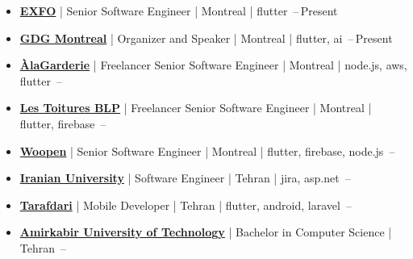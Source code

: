 \documentclass[letterpaper,11pt]{article}
\begin{document}


\begin{itemize}[leftmargin=*, noitemsep, topsep=0pt, partopsep=0pt]
      \item
            \href{https://exfo.com}
            {\textbf{EXFO}} | Senior Software Engineer | Montreal | flutter
            \hfill {}\,--\,Present

      \item    \BigGap
            \href{https://gdg.community.dev/gdg-montreal}
            {\textbf{GDG Montreal}} | Organizer and Speaker | Montreal | flutter, ai
            \hfill {}\,--\,Present

      \item    \BigGap
            \href{https://alagarderie.ca}
            {\textbf{ÀlaGarderie}} | Freelancer Senior Software Engineer | Montreal | node.js, aws, flutter
            \hfill {}\,--\,

      \item    \BigGap
            \href{https://toituresblp.ca}
            {\textbf{Les Toitures BLP}} | Freelancer Senior Software Engineer | Montreal | flutter, firebase
            \hfill {}\,--\,

      \item    \BigGap
            \href{https://woopen.com}
            {\textbf{Woopen}} | Senior Software Engineer | Montreal | flutter, firebase, node.js
            \hfill {}\,--\,

      \item   \BigGap
            \href{https://en.iranian.ac.ir}
            {\textbf{Iranian University}} | Software Engineer | Tehran | jira, asp.net
            \hfill {}\,--\,

      \item   \BigGap
            \href{https://tarafdari.com}
            {\textbf{Tarafdari}} | Mobile Developer | Tehran | flutter, android, laravel
            \hfill {}\,--\,

      \item   \BigGap
            \href{https://aut.ac.ir/en}
            {\textbf{Amirkabir University of Technology}} | Bachelor in Computer Science | Tehran
            \hfill {}\,--\,
\end{itemize}
\end{document}
